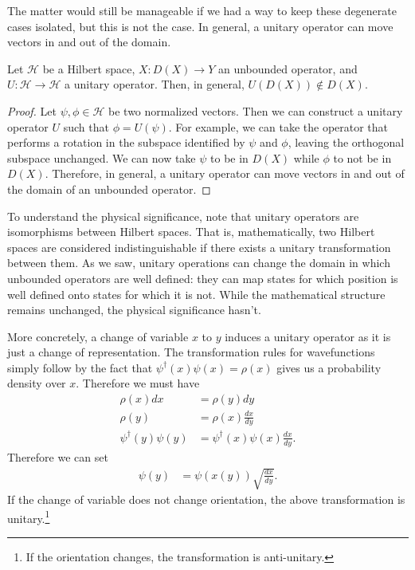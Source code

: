 \documentclass[10pt,twocolumn, nofootinbib]{revtex4-2}
\begin{document}
The matter would still be manageable if we had a way to keep these degenerate cases isolated, but this is not the case. In general, a unitary operator can move vectors in and out of the domain.
\begin{prop}
Let $\mathcal{H}$ be a Hilbert space, $X : D(X) \to Y$ an unbounded operator, and $U : \mathcal{H} \to \mathcal{H}$ a unitary operator. Then, in general, $U(D(X)) \notin D(X)$.
\end{prop}
\begin{proof}
Let $\psi, \phi \in \mathcal{H}$ be two normalized vectors. Then we can construct a unitary operator $U$ such that $\phi = U(\psi)$. For example, we can take the operator that performs a rotation in the subspace identified by $\psi$ and $\phi$, leaving the orthogonal subspace unchanged. We can now take $\psi$ to be in $D(X)$ while $\phi$ to not be in $D(X)$. Therefore, in general, a unitary operator can move vectors in and out of the domain of an unbounded operator.
\end{proof}

To understand the physical significance, note that unitary operators are isomorphisms between Hilbert spaces. That is, mathematically, two Hilbert spaces are considered indistinguishable if there exists a unitary transformation between them. As we saw, unitary operations can change the domain in which unbounded operators are well defined: they can map states for which position is well defined onto states for which it is not. While the mathematical structure remains unchanged, the physical significance hasn't.

More concretely, a change of variable $x$ to $y$ induces a unitary operator as it is just a change of representation. The transformation rules for wavefunctions simply follow by the fact that $\psi^\dagger(x) \psi(x) = \rho(x)$ gives us a probability density over $x$. Therefore we must have
\begin{equation}
	\begin{aligned}
		\rho(x) dx &= \rho(y) dy \\
		\rho(y) &= \rho(x) \frac{dx}{dy} \\
		\psi^\dagger(y) \psi(y) &= \psi^\dagger(x) \psi(x) \frac{dx}{dy}.
	\end{aligned}
\end{equation}
Therefore we can set 
\begin{equation}
	\begin{aligned}
		\psi(y) &= \psi(x(y)) \sqrt{\frac{dx}{dy}}.
	\end{aligned}
\end{equation}
If the change of variable does not change orientation, the above transformation is unitary.\footnote{If the orientation changes, the transformation is anti-unitary.}
\end{document}
